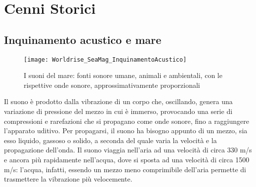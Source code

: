
\chapter{Cenni Storici}

\section {Inquinamento acustico e mare}
\begin{figure}[h]
\centering
\texttt{[image: Worldrise\_SeaMag\_InquinamentoAcustico]}
\caption{I suoni del mare: fonti sonore umane, animali e ambientali, con le rispettive onde sonore, approssimativamente proporzionali}
\end{figure}

Il suono è prodotto dalla vibrazione di un corpo che, oscillando, genera una variazione di pressione del mezzo in cui è immerso, provocando una serie di compressioni e rarefazioni che si propagano come onde sonore, fino a raggiungere l’apparato uditivo. 
Per propagarsi, il suono ha bisogno appunto di un mezzo, sia esso liquido, gassoso o solido, a seconda del quale varia la velocità e la propagazione dell’onda. 
Il suono viaggia nell’aria ad una velocità di circa 330 m/s e ancora più rapidamente nell’acqua, dove si sposta ad una velocità di circa 1500 m/s: l’acqua, infatti, essendo un mezzo meno comprimibile dell’aria permette di trasmettere la vibrazione più velocemente.

